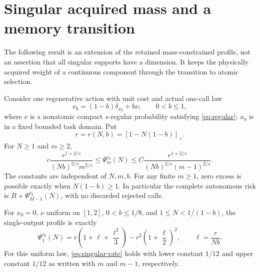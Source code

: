\section{Singular acquired mass and a memory transition}\label{sec:singular}
The following result is an extension of the retained mass-constrained profile, not an assertion that all singular supports have a dimension. It keeps the physically acquired weight of a continuous component through the transition to atomic selection.

\begin{theorem}\label{thm:singular}
Consider one regenerative action with unit cost and actual one-call law
\begin{equation}\label{eq:mixture}
 \nu_b=(1-b)\delta_{x_0}+b\nu,\qquad 0<b\le1,
\end{equation}
where $\nu$ is a nonatomic compact $s$-regular probability satisfying \eqref{eq:regular}; $x_0$ is in a fixed bounded task domain. Put
\[
 r=r(N,b)=[1-N(1-b)]_+.
\]
For $N\ge1$ and $m\ge2$,
\begin{equation}\label{eq:singular-rate}
 c\frac{r^{1+2/s}}{(Nb)^{2/s}m^{2/s}}
 \le\Psi_m^{\nu_b}(N)
 \le C\frac{r^{1+2/s}}{(Nb)^{2/s}(m-1)^{2/s}}.
\end{equation}
The constants are independent of $N,m,b$. For any finite $m\ge1$, zero excess is possible exactly when $N(1-b)\ge1$. In particular the complete autonomous risk is $B+\Psi_{M-1}^{\nu_b}(N)$, with no discarded rejected calls.

For $x_0=0$, $\nu$ uniform on $[1,2]$, $0<b\le1/8$, and $1\le N<1/(1-b)$, the single-output profile is exactly
\begin{equation}\label{eq:one-center}
 \Psi_1^{\nu_b}(N)
 =r\left(1+\ell+\frac{\ell^2}{3}\right)
   -r^2\left(1+\frac\ell2\right)^2,
 \qquad \ell=\frac r{Nb}.
\end{equation}
For this uniform law, \eqref{eq:singular-rate} holds with lower constant $1/12$ and upper constant $1/12$ as written with $m$ and $m-1$, respectively.
\end{theorem}
